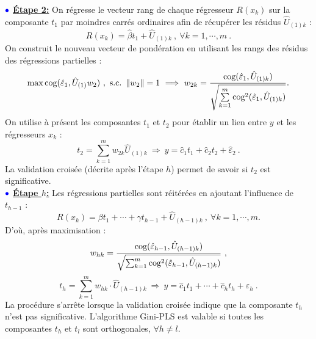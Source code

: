 $\bulle$ \underline{\textbf{Étape 2:}} On régresse le vecteur rang de chaque régresseur $R(x_k)$ sur la composante $t_1$ par moindres carrés ordinaires afin de récupérer les résidus $\hat{U}_{(1)k}$ : 
\[
R(x_k) = \hat{\beta}t_1 + \hat{U}_{(1)k} \ , \ \forall k = 1,\cdots, m \ .
\]
On construit le nouveau vecteur de pondération en utilisant les rangs des résidus des régressions partielles :
\[
\mathop{\mathrm{max}}\limits \text{cog}(\hat{\varepsilon}_1,\hat{U}_{(1)} w_2) \ , \ \text{s.c.} \ \left\|w_2\right\|=1 \ \Longrightarrow \ w_{2k} = \frac{\text{cog}(\hat{\varepsilon}_1,\hat{U}_{(1)k})}{\sqrt{\sum\limits_{k=1}^m \text{cog}^2(\hat{\varepsilon}_1,\hat{U}_{(1)k})}} .
\]
On utilise à présent les composantes $t_1$ et $t_2$ pour établir un lien entre $y$ et les régresseurs $x_k$ :
\[
t_2 = \sum\limits^m_{k=1} w_{2k} \hat{U}_{(1)k} \ \Longrightarrow \ y = \hat{c}_1 t_1 + \hat{c}_2 t_2 + \hat{\varepsilon}_2 \ .
\]
La validation croisée (décrite après l'étape $h$) permet de savoir si $t_2$ est significative.\\

$\bulle$ \underline{\textbf{Étape $h$:}} Les régressions partielles sont réitérées en ajoutant l'influence de $t_{h-1}$ :
\[
R(x_k) = \beta t_1 + \cdots + \gamma t_{h-1} + \hat{U}_{(h-1)k} \ , \ \forall k = 1,\cdots, m.
\]
D'où, après maximisation :
\[
w_{hk} = \frac{\text{cog}(\hat{\varepsilon}_{h-1},\hat{U}_{(h-1)k})}{\sqrt{\sum_{k=1}^m \text{cog}^2(\hat{\varepsilon}_{h-1},\hat{U}_{(h-1)k})}} \ ,
\]
\[
t_h = \sum_{k=1}^m w_{hk}\cdot \hat{U}_{(h-1)k} \ \Longrightarrow \ y = \hat{c}_1 t_1 + \cdots + \hat{c}_h t_h + \varepsilon_h \ .
\]
La procédure s'arrête lorsque la validation croisée indique que la composante $t_h$ n'est pas significative. L'algorithme Gini-PLS est valable si toutes les composantes $t_h$ et $t_l$ sont orthogonales, $\forall h\neq l$. 

\medskip

